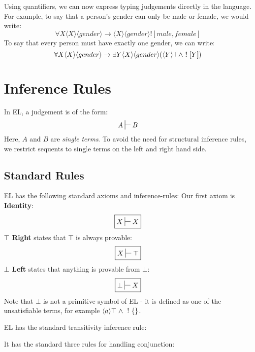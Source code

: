 Using quantifiers, we can now express typing judgements directly in the language. For example, to say that a person's gender can only be male or female, we would write:
\[
\forall X \langle X \rangle \langle gender \rangle \rightarrow \langle X \rangle \langle gender \rangle ![male, female]
\]
To say that every person must have exactly one gender, we can write:
\[
\forall X  \langle X \rangle \langle gender \rangle \rightarrow \exists Y \langle X \rangle \langle gender \rangle (\langle Y \rangle \top \land \ ! \  [Y])
\]

\section{Inference Rules}
In EL, a judgement is of the form:
\[
A \judge B
\]
Here, $A$ and $B$ are \emph{single terms}.
To avoid the need for structural inference rules, we restrict sequents to single terms on the left and right hand side.

\subsection{Standard Rules}
EL has the following standard axioms and inference-rules:
Our first axiom is {\bf Identity}:
\[
\boxed
{
X \judge X
}
\]
{\bf $\top$ Right} states that $\top$ is always provable:
\[
\boxed
{
X \judge \top
}
\]
{\bf $\bot$ Left} states that anything is provable from $\bot$:
\[
\boxed
{
\bot \judge X
}
\]
Note that $\bot$ is not a primitive symbol of EL - it is defined as one of the unsatisfiable terms, for example $\langle a \rangle \top \; \land \; \ ! \  \{\}$. 

EL has the standard transitivity inference rule:
\begin{center}
\end{center}
It has the standard three rules for handling conjunction:
\begin{center}
\end{center}

\begin{center}
\end{center}

\begin{center}
\end{center}

